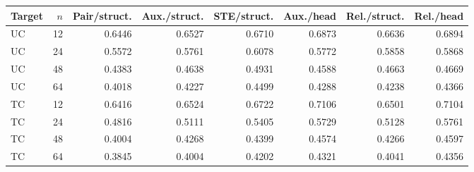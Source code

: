 \begin{tabular}{@{}lrrrrrrr@{}}
\toprule
Target & $n$ & Pair/struct. & Aux./struct. & STE/struct. & Aux./head & Rel./struct. & Rel./head\\
\midrule
UC & 12 & 0.6446 & 0.6527 & 0.6710 & 0.6873 & 0.6636 & 0.6894\\
UC & 24 & 0.5572 & 0.5761 & 0.6078 & 0.5772 & 0.5858 & 0.5868\\
UC & 48 & 0.4383 & 0.4638 & 0.4931 & 0.4588 & 0.4663 & 0.4669\\
UC & 64 & 0.4018 & 0.4227 & 0.4499 & 0.4288 & 0.4238 & 0.4366\\
TC & 12 & 0.6416 & 0.6524 & 0.6722 & 0.7106 & 0.6501 & 0.7104\\
TC & 24 & 0.4816 & 0.5111 & 0.5405 & 0.5729 & 0.5128 & 0.5761\\
TC & 48 & 0.4004 & 0.4268 & 0.4399 & 0.4574 & 0.4266 & 0.4597\\
TC & 64 & 0.3845 & 0.4004 & 0.4202 & 0.4321 & 0.4041 & 0.4356\\
\bottomrule
\end{tabular}
